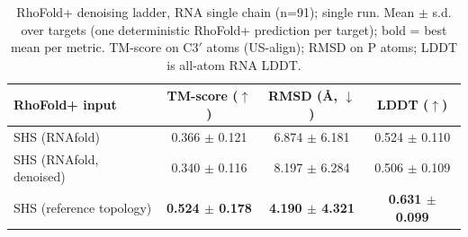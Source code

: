 \begin{table}[htbp]
\centering
\caption{RhoFold+ denoising ladder, RNA single chain (n=91); single run. Mean $\pm$ s.d. over targets (one deterministic RhoFold+ prediction per target); bold = best mean per metric. TM-score on C3$'$ atoms (US-align); RMSD on P atoms; LDDT is all-atom RNA LDDT.}
\label{tab:denoise_main_rf}
\begin{tabular}{lccc}
\toprule
RhoFold+ input & TM-score ($\uparrow$) & RMSD (\AA, $\downarrow$) & LDDT ($\uparrow$) \\
\midrule
SHS (RNAfold) & 0.366 $\pm$ 0.121 & 6.874 $\pm$ 6.181 & 0.524 $\pm$ 0.110 \\
SHS (RNAfold, denoised) & 0.340 $\pm$ 0.116 & 8.197 $\pm$ 6.284 & 0.506 $\pm$ 0.109 \\
SHS (reference topology) & \textbf{0.524 $\pm$ 0.178} & \textbf{4.190 $\pm$ 4.321} & \textbf{0.631 $\pm$ 0.099} \\
\bottomrule
\end{tabular}
\end{table}

